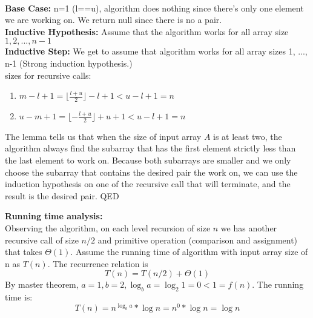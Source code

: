 \documentclass{article}
\begin{document}
\\\textbf{Base Case:} n=1 (l==u), algorithm does nothing since there's only one element we are working on. We return null since there is no a pair.
\\\textbf{Inductive Hypothesis:} Assume that the algorithm works for all array size $1, 2, ..., n-1$
\\\textbf{Inductive Step:} We get to assume that algorithm works
for all array sizes 1, ..., n-1 (Strong induction hypothesis.) 
\\sizes for recursive calls:
\begin{enumerate}
    \item $m-l+1 = \lfloor \frac{l+u}{2}\rfloor - l + 1 < u-l+1=n$
    \item $u-m+1 = \lfloor -\frac{l+u}{2}\rfloor +u + 1 < u-l+1=n$
\end{enumerate}

The lemma tells us that when the size of input array $A$ is at least two, the algorithm always find the subarray that has the first element strictly less than the last element to work on. Because both subarrays are smaller and we only choose the subarray that contains the desired pair the work on, we can use the induction hypothesis on one of the recursive call that will terminate, and the result is the desired pair. QED

\textbf{Running time analysis:}\\
Observing the algorithm, on each level recursion of size $n$ we has another recursive call of size $n/2$ and primitive operation (comparison and assignment) that takes $\Theta(1)$. Assume the running time of algorithm with input array size of n as $T(n)$. The recurrence relation is \[T(n)=T(n/2)+\Theta(1)\]
By master theorem, $a = 1, b = 2, \log_b{a} = \log_2{1} = 0 < 1 = f(n)$. The running time is: \[T(n) = n^{\log_b{a}}*\log{n} = n^0*\log{n} = \log{n}\]
\end{document}
